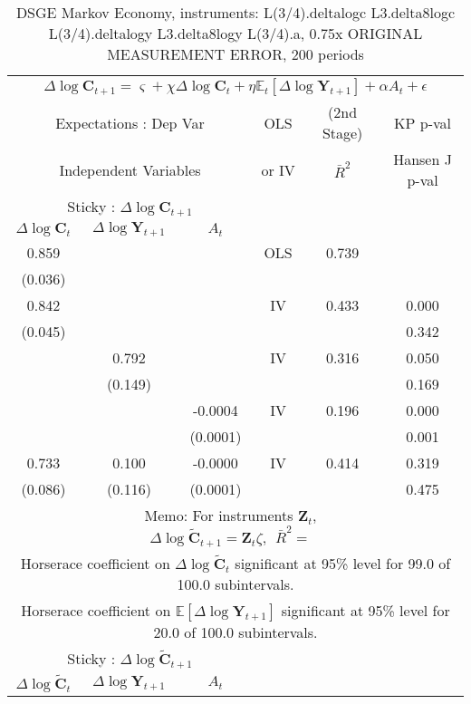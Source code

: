 \begin{table}\caption{DSGE Markov Economy, instruments: L(3/4).deltalogc L3.delta8logc L(3/4).deltalogy L3.delta8logy L(3/4).a, 0.75x ORIGINAL MEASUREMENT ERROR, 200 periods}
\begin{tabular}{cccccc}
 \hline \hline\multicolumn{6}{c}{$ \Delta \log \mathbf{C}_{t+1} = \varsigma + \chi \Delta \log \mathbf{C}_t + \eta \mathbb{E}_t[\Delta \log \mathbf{Y}_{t+1}] + \alpha A_t + \epsilon $ } 
\\ \multicolumn{3}{c}{Expectations : Dep Var} & OLS &  (2nd Stage) & KP p-val 
\\ \multicolumn{3}{c}{Independent Variables} & or IV & $ \bar{R}^{2} $ & Hansen J p-val 
\\ \hline \multicolumn{3}{c}{Sticky : $\Delta \log \mathbf{C}_{t+1}$} %
\\ \multicolumn{1}{c}{$\Delta \log {\mathbf{C}}_{t}$} & \multicolumn{1}{c}{$\Delta \log \mathbf{Y}_{t+1}$} & \multicolumn{1}{c}{$A_{t}$} 
\\  0.859 & & & OLS & 0.739 & %
\\  (0.036) & & & & & %
\\  0.842 & & & IV & 0.433 & 0.000
\\  (0.045) & & & & & 0.342
\\ & 0.792 & & IV & 0.316 & 0.050
\\ & (0.149) & & & & 0.169
\\ & & -0.0004 & IV & 0.196 & 0.000
\\ & & (0.0001) & & & 0.001
\\ 0.733 & 0.100 & -0.0000 & IV & 0.414 & 0.319
\\ (0.086) & (0.116) & (0.0001) & & & 0.475
\\ & \multicolumn{4}{c}{Memo: For instruments $\mathbf{Z}_{t}$,  $\Delta \log \widetilde{\mathbf{C}}_{t+1} = \mathbf{Z}_{t} \zeta,~~\bar{R}^{2}=$ } 0.426 & 
\\ \multicolumn{6}{c}{Horserace coefficient on $\Delta \log \widetilde{\mathbf{C}}_t$ significant at 95\% level for 99.0 of 100.0 subintervals.} 
\\ \multicolumn{6}{c}{Horserace coefficient on $\mathbb{E}[\Delta \log \mathbf{Y}_{t+1}]$ significant at 95\% level for 20.0 of 100.0 subintervals.} 
\\ \hline \multicolumn{3}{c}{Sticky : $\Delta \log \widetilde{\mathbf{C}}_{t+1} $}%
\\ \multicolumn{1}{c}{$\Delta \log {\widetilde{\mathbf{C}}}_{t}$} & \multicolumn{1}{c}{$\Delta \log \mathbf{Y}_{t+1}$} & \multicolumn{1}{c}{$A_{t}$} 

\end{tabular}
\end{table}
